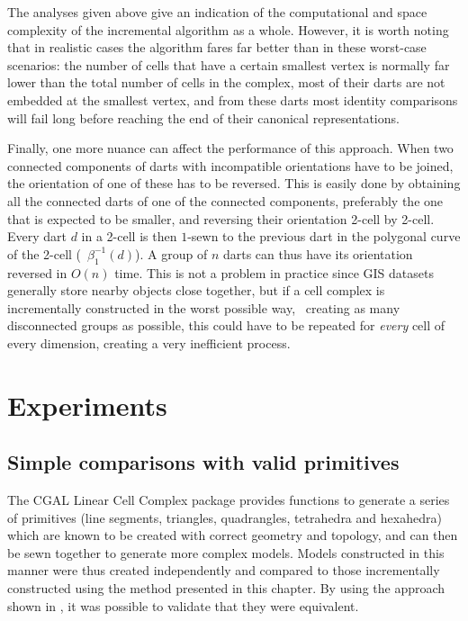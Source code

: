 The analyses given above give an indication of the computational and space complexity of the incremental algorithm as a whole.
However, it is worth noting that in realistic cases the algorithm fares far better than in these worst-case scenarios: the number of cells that have a certain smallest vertex is normally far lower than the total number of cells in the complex, most of their darts are not embedded at the smallest vertex, and from these darts most identity comparisons will fail long before reaching the end of their canonical representations.

Finally, one more nuance can affect the performance of this approach.
When two connected components of darts with incompatible orientations have to be joined, the orientation of one of these has to be reversed.
This is easily done by obtaining all the connected darts of one of the connected components, preferably the one that is expected to be smaller, and reversing their orientation 2-cell by 2-cell.
Every dart $d$ in a 2-cell is then $1$-sewn to the previous dart in the polygonal curve of the 2-cell (\ie\ $\beta_{1}^{-1}(d)$).
A group of $n$ darts can thus have its orientation reversed in $O(n)$ time.
This is not a problem in practice since GIS datasets generally store nearby objects close together, but if a cell complex is incrementally constructed in the worst possible way, \ie\ creating as many disconnected groups as possible, this could have to be repeated for \emph{every} cell of every dimension, creating a very inefficient process.

\section{Experiments}
\label{se:incremental-experiments}

\subsection*{Simple comparisons with valid primitives}

The CGAL Linear Cell Complex package provides functions to generate a series of primitives (line segments, triangles, quadrangles, tetrahedra and hexahedra) which are known to be created with correct geometry and topology, and can then be sewn together to generate more complex models.
Models constructed in this manner were thus created independently and compared to those incrementally constructed using the method presented in this chapter.
By using the approach shown in , it was possible to validate that they were equivalent.

